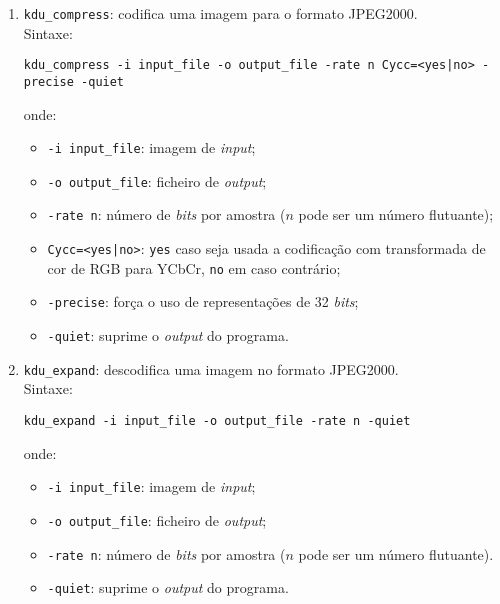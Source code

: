 \begin{enumerate}
    \item \texttt{kdu\_compress}: codifica uma imagem para o formato JPEG2000.\\
    Sintaxe:
    \begin{verbatim}
kdu_compress -i input_file -o output_file -rate n Cycc=<yes|no> -precise -quiet
    \end{verbatim}
    onde:
    \begin{itemize}
        \item \verb|-i input_file|: imagem de \textit{input};
        \item \verb|-o output_file|: ficheiro de \textit{output};
        \item \verb|-rate n|: número de \textit{bits} por amostra ($n$ pode ser um número flutuante);
        \item \verb#Cycc=<yes|no>#: \verb|yes| caso seja usada a codificação com transformada de cor de \ac{RGB} para YCbCr, \verb|no| em caso contrário;
        \item \verb|-precise|: força o uso de representações de 32 \textit{bits};
        \item \verb|-quiet|: suprime o \textit{output} do programa.
    \end{itemize}
    
    \item \texttt{kdu\_expand}: descodifica uma imagem no formato JPEG2000.\\
    Sintaxe:
    \begin{verbatim}
kdu_expand -i input_file -o output_file -rate n -quiet
    \end{verbatim}
    onde:
    \begin{itemize}
        \item \verb|-i input_file|: imagem de \textit{input};
        \item \verb|-o output_file|: ficheiro de \textit{output};
        \item \verb|-rate n|: número de \textit{bits} por amostra ($n$ pode ser um número flutuante).
        \item \verb|-quiet|: suprime o \textit{output} do programa.
    \end{itemize}
\end{enumerate}


